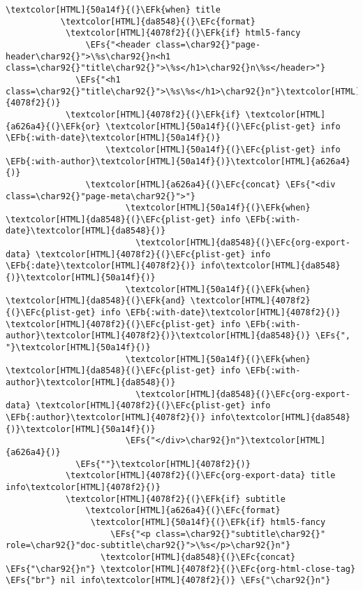 \documentclass{scrartcl}
\newcommand{\EFk}[1]{\textcolor{EFk}{#1}} %
\newcommand{\EFs}[1]{\textcolor{EFs}{#1}} %
\newcommand{\EFb}[1]{\textcolor{EFb}{#1}} %
\newcommand{\EFc}[1]{\textcolor{EFc}{#1}} %
\begin{document}
\begin{Code}
\begin{Verbatim}[]
         \textcolor[HTML]{50a14f}{(}\EFk{when} title
           \textcolor[HTML]{da8548}{(}\EFc{format}
            \textcolor[HTML]{4078f2}{(}\EFk{if} html5-fancy
                \EFs{"<header class=\char92{}"page-header\char92{}">\%s\char92{}n<h1 class=\char92{}"title\char92{}">\%s</h1>\char92{}n\%s</header>"}
              \EFs{"<h1 class=\char92{}"title\char92{}">\%s\%s</h1>\char92{}n"}\textcolor[HTML]{4078f2}{)}
            \textcolor[HTML]{4078f2}{(}\EFk{if} \textcolor[HTML]{a626a4}{(}\EFk{or} \textcolor[HTML]{50a14f}{(}\EFc{plist-get} info \EFb{:with-date}\textcolor[HTML]{50a14f}{)}
                    \textcolor[HTML]{50a14f}{(}\EFc{plist-get} info \EFb{:with-author}\textcolor[HTML]{50a14f}{)}\textcolor[HTML]{a626a4}{)}
                \textcolor[HTML]{a626a4}{(}\EFc{concat} \EFs{"<div class=\char92{}"page-meta\char92{}">"}
                        \textcolor[HTML]{50a14f}{(}\EFk{when} \textcolor[HTML]{da8548}{(}\EFc{plist-get} info \EFb{:with-date}\textcolor[HTML]{da8548}{)}
                          \textcolor[HTML]{da8548}{(}\EFc{org-export-data} \textcolor[HTML]{4078f2}{(}\EFc{plist-get} info \EFb{:date}\textcolor[HTML]{4078f2}{)} info\textcolor[HTML]{da8548}{)}\textcolor[HTML]{50a14f}{)}
                        \textcolor[HTML]{50a14f}{(}\EFk{when} \textcolor[HTML]{da8548}{(}\EFk{and} \textcolor[HTML]{4078f2}{(}\EFc{plist-get} info \EFb{:with-date}\textcolor[HTML]{4078f2}{)} \textcolor[HTML]{4078f2}{(}\EFc{plist-get} info \EFb{:with-author}\textcolor[HTML]{4078f2}{)}\textcolor[HTML]{da8548}{)} \EFs{", "}\textcolor[HTML]{50a14f}{)}
                        \textcolor[HTML]{50a14f}{(}\EFk{when} \textcolor[HTML]{da8548}{(}\EFc{plist-get} info \EFb{:with-author}\textcolor[HTML]{da8548}{)}
                          \textcolor[HTML]{da8548}{(}\EFc{org-export-data} \textcolor[HTML]{4078f2}{(}\EFc{plist-get} info \EFb{:author}\textcolor[HTML]{4078f2}{)} info\textcolor[HTML]{da8548}{)}\textcolor[HTML]{50a14f}{)}
                        \EFs{"</div>\char92{}n"}\textcolor[HTML]{a626a4}{)}
              \EFs{""}\textcolor[HTML]{4078f2}{)}
            \textcolor[HTML]{4078f2}{(}\EFc{org-export-data} title info\textcolor[HTML]{4078f2}{)}
            \textcolor[HTML]{4078f2}{(}\EFk{if} subtitle
                \textcolor[HTML]{a626a4}{(}\EFc{format}
                 \textcolor[HTML]{50a14f}{(}\EFk{if} html5-fancy
                     \EFs{"<p class=\char92{}"subtitle\char92{}" role=\char92{}"doc-subtitle\char92{}">\%s</p>\char92{}n"}
                   \textcolor[HTML]{da8548}{(}\EFc{concat} \EFs{"\char92{}n"} \textcolor[HTML]{4078f2}{(}\EFc{org-html-close-tag} \EFs{"br"} nil info\textcolor[HTML]{4078f2}{)} \EFs{"\char92{}n"}

\end{Verbatim}
\end{Code}
\end{document}
